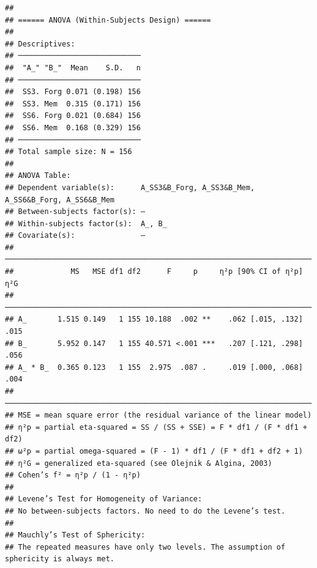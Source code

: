 \documentclass[
  man]{apa6}
\begin{document}
\begin{verbatim}
## 
## ====== ANOVA (Within-Subjects Design) ======
## 
## Descriptives:
## ────────────────────────────
##  "A_" "B_"  Mean    S.D.   n
## ────────────────────────────
##  SS3. Forg 0.071 (0.198) 156
##  SS3. Mem  0.315 (0.171) 156
##  SS6. Forg 0.021 (0.684) 156
##  SS6. Mem  0.168 (0.329) 156
## ────────────────────────────
## Total sample size: N = 156
## 
## ANOVA Table:
## Dependent variable(s):      A_SS3&B_Forg, A_SS3&B_Mem, A_SS6&B_Forg, A_SS6&B_Mem
## Between-subjects factor(s): –
## Within-subjects factor(s):  A_, B_
## Covariate(s):               –
## ──────────────────────────────────────────────────────────────────────
##             MS   MSE df1 df2      F     p     η²p [90% CI of η²p]  η²G
## ──────────────────────────────────────────────────────────────────────
## A_       1.515 0.149   1 155 10.188  .002 **    .062 [.015, .132] .015
## B_       5.952 0.147   1 155 40.571 <.001 ***   .207 [.121, .298] .056
## A_ * B_  0.365 0.123   1 155  2.975  .087 .     .019 [.000, .068] .004
## ──────────────────────────────────────────────────────────────────────
## MSE = mean square error (the residual variance of the linear model)
## η²p = partial eta-squared = SS / (SS + SSE) = F * df1 / (F * df1 + df2)
## ω²p = partial omega-squared = (F - 1) * df1 / (F * df1 + df2 + 1)
## η²G = generalized eta-squared (see Olejnik & Algina, 2003)
## Cohen’s f² = η²p / (1 - η²p)
## 
## Levene’s Test for Homogeneity of Variance:
## No between-subjects factors. No need to do the Levene’s test.
## 
## Mauchly’s Test of Sphericity:
## The repeated measures have only two levels. The assumption of sphericity is always met.
\end{verbatim}
\end{document}
